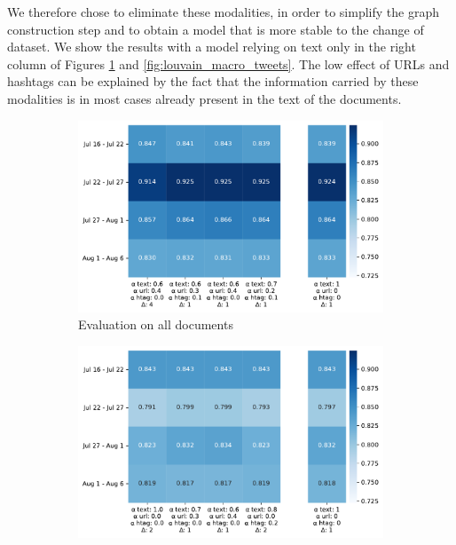   We therefore chose to eliminate these modalities, in order to simplify the graph construction step and to obtain a model that is more stable to the change of dataset. We show the results with a model relying on text only in the right column of Figures \ref{fig:louvain_macro_all} and \ref{fig:louvain_macro_tweets}. The low effect of URLs and hashtags can be explained by the fact that the information carried by these modalities is in most cases already present in the text of the documents.
 \begin{figure}
 
 \begin{subfigure}[b]{1\textwidth}
    \begin{center}
      \includegraphics[height=.4\textheight]{figures/louvain_macro_tfidf.pdf}
    \caption{Evaluation on all documents}
    \label{fig:louvain_macro_all}
    \end{center}
\end{subfigure}
\begin{subfigure}[b]{1\textwidth}
\begin{center}
 \includegraphics[height=.4\textheight]{figures/louvain_macro_tfidf_tweets_only.pdf}

\end{center}
\end{subfigure}
\end{figure}
